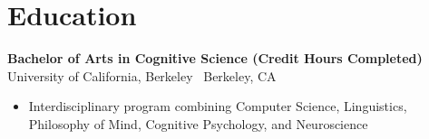 \documentclass[a4paper,10pt]{article}
\begin{document}
\section*{Education}
 
\textbf{Bachelor of Arts in Cognitive Science (Credit Hours Completed)} \\
University of California, Berkeley \textbar\ Berkeley, CA
\begin{itemize}[itemsep=0em]
\item Interdisciplinary program combining Computer Science, Linguistics, Philosophy of Mind, Cognitive Psychology, and Neuroscience
\end{itemize}
\end{document}
